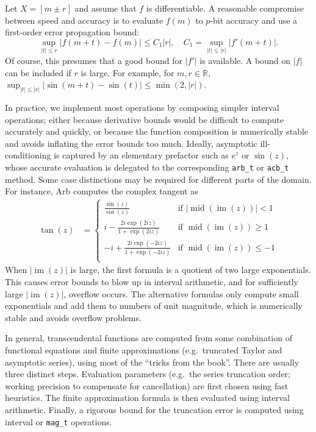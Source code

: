 \documentclass[10pt,journal,compsoc,cspaper]{IEEEtran}
\begin{document}
Let $X = [m \pm r]$ and assume that $f$ is differentiable.
A reasonable compromise between speed and accuracy
is to evaluate $f(m)$ to $p$-bit accuracy
and use a first-order error propagation bound:
$$\sup_{|t| \le r} |f(m+t) - f(m)| \le C_1 |r|, \quad C_1 = \sup_{|t| \le |r|} |f'(m+t)|.$$
Of course, this presumes that a good bound for $|f'|$ is available.
A bound on $|f|$ can be included if $r$ is large.
For example, for $m,r \in \mathbb{R}$,
$\sup_{|t| \le |r|} |\sin(m+t) - \sin(t)| \le \min(2, |r|)$.


In practice, we implement most operations by composing simpler
interval operations; either because
derivative bounds would be difficult to compute accurately and quickly,
or because the function composition is numerically stable
and avoids inflating the error bounds too much.
Ideally, asymptotic ill-conditioning
is captured by an elementary prefactor such as $e^z$ or $\sin(z)$,
whose accurate evaluation is delegated to
the corresponding \texttt{arb\_t} or \texttt{acb\_t} method.
Some case distinctions may be required
for different parts of the domain.
For instance, Arb computes the complex tangent as
\begin{align*}
 \tan(z) &=
  \begin{cases}
   \displaystyle
   \frac{\sin(z)}{\cos(z)}                      & \text{if } |\operatorname{mid}(\operatorname{im}(z))| < 1 \\[1em]
   \displaystyle
   i - \frac{2i \exp(2iz)}{1 + \exp(2iz)}       & \text{if } \operatorname{mid}(\operatorname{im}(z)) \ge 1 \\[1em]
   \displaystyle
   -i + \frac{2i \exp(-2iz)}{1 + \exp(-2iz)}    & \text{if } \operatorname{mid}(\operatorname{im}(z)) \le -1 \\
  \end{cases}
\end{align*}
When $|\operatorname{im}(z)|$ is large, the first formula is a
quotient of two large exponentials. This causes error bounds to blow up
in interval arithmetic, and for sufficiently large $|\operatorname{im}(z)|$,
overflow occurs.
The alternative formulas only compute small exponentials and add them
to numbers of unit magnitude, which is numerically stable
and avoids overflow problems.

In general, transcendental functions are computed
from some combination of functional equations
and finite approximations (e.g.\ truncated Taylor and asymptotic series),
using most of the ``tricks from the book''.
There are usually three distinct steps. Evaluation parameters
(e.g.\ the series truncation order; working precision to
compensate for cancellation) are first chosen using fast heuristics.
The finite approximation formula is then evaluated using interval
arithmetic. Finally, a rigorous bound for the truncation error
is computed using interval or \texttt{mag\_t} operations.
\end{document}
